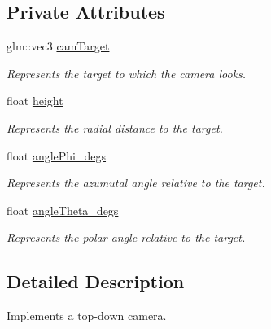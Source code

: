 \subsection*{Private Attributes}
\begin{DoxyCompactItemize}
\item 
\hypertarget{class_top_down_camera_af4419ea1574e66a342258a0937272740}{glm\-::vec3 \hyperlink{class_top_down_camera_af4419ea1574e66a342258a0937272740}{cam\-Target}}\label{class_top_down_camera_af4419ea1574e66a342258a0937272740}

\begin{DoxyCompactList}\small\item\em Represents the target to which the camera looks. \end{DoxyCompactList}\item 
\hypertarget{class_top_down_camera_a685ade76e8e5174cd742ba094f60d4ff}{float \hyperlink{class_top_down_camera_a685ade76e8e5174cd742ba094f60d4ff}{height}}\label{class_top_down_camera_a685ade76e8e5174cd742ba094f60d4ff}

\begin{DoxyCompactList}\small\item\em Represents the radial distance to the target. \end{DoxyCompactList}\item 
\hypertarget{class_top_down_camera_a896c500558bbbddcdf6aacd5a9231f76}{float \hyperlink{class_top_down_camera_a896c500558bbbddcdf6aacd5a9231f76}{angle\-Phi\-\_\-degs}}\label{class_top_down_camera_a896c500558bbbddcdf6aacd5a9231f76}

\begin{DoxyCompactList}\small\item\em Represents the azumutal angle relative to the target. \end{DoxyCompactList}\item 
\hypertarget{class_top_down_camera_a834f483f9ee746144f5469bf5879b1b0}{float \hyperlink{class_top_down_camera_a834f483f9ee746144f5469bf5879b1b0}{angle\-Theta\-\_\-degs}}\label{class_top_down_camera_a834f483f9ee746144f5469bf5879b1b0}

\begin{DoxyCompactList}\small\item\em Represents the polar angle relative to the target. \end{DoxyCompactList}\end{DoxyCompactItemize}


\subsection{Detailed Description}
Implements a top-\/down camera. 

